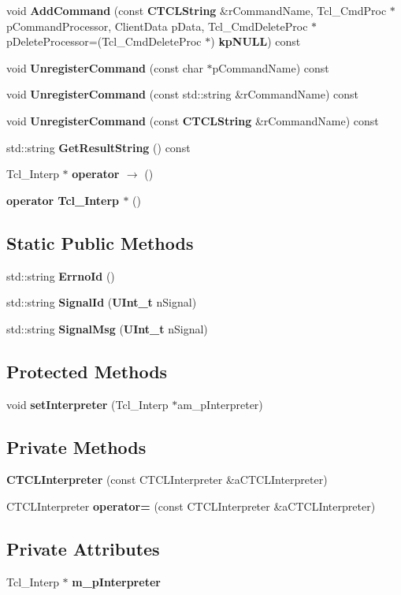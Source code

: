 \begin{CompactItemize}
\item 
void {\bf Add\-Command} (const {\bf CTCLString} \&r\-Command\-Name, Tcl\_\-Cmd\-Proc $\ast$p\-Command\-Processor, Client\-Data p\-Data, Tcl\_\-Cmd\-Delete\-Proc $\ast$p\-Delete\-Processor=(Tcl\_\-Cmd\-Delete\-Proc $\ast$) {\bf kp\-NULL}) const
\item 
void {\bf Unregister\-Command} (const char $\ast$p\-Command\-Name) const
\item 
void {\bf Unregister\-Command} (const std::string \&r\-Command\-Name) const
\item 
void {\bf Unregister\-Command} (const {\bf CTCLString} \&r\-Command\-Name) const
\item 
std::string {\bf Get\-Result\-String} () const
\item 
Tcl\_\-Interp $\ast$ {\bf operator $\rightarrow$ } ()
\item 
{\bf operator Tcl\_\-Interp $\ast$} ()
\end{CompactItemize}
\subsection*{Static Public Methods}
\begin{CompactItemize}
\item 
std::string {\bf Errno\-Id} ()
\item 
std::string {\bf Signal\-Id} ({\bf UInt\_\-t} n\-Signal)
\item 
std::string {\bf Signal\-Msg} ({\bf UInt\_\-t} n\-Signal)
\end{CompactItemize}
\subsection*{Protected Methods}
\begin{CompactItemize}
\item 
void {\bf set\-Interpreter} (Tcl\_\-Interp $\ast$am\_\-p\-Interpreter)
\end{CompactItemize}
\subsection*{Private Methods}
\begin{CompactItemize}
\item 
{\bf CTCLInterpreter} (const CTCLInterpreter \&a\-CTCLInterpreter)
\item 
CTCLInterpreter {\bf operator=} (const CTCLInterpreter \&a\-CTCLInterpreter)
\end{CompactItemize}
\subsection*{Private Attributes}
\begin{CompactItemize}
\item 
Tcl\_\-Interp $\ast$ {\bf m\_\-p\-Interpreter}
\end{CompactItemize}


